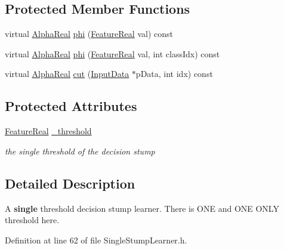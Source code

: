 \subsection*{Protected Member Functions}
\begin{DoxyCompactItemize}
\item 
virtual \hyperlink{Defaults_8h_a80184c4fd10ab70a1a17c5f97dcd1563}{AlphaReal} \hyperlink{classMultiBoost_1_1SingleStumpLearner_a7081db9aa7b8abcb6d7021d91fac5455}{phi} (\hyperlink{Defaults_8h_a3a11cfe6a5d469d921716ca6291e934f}{FeatureReal} val) const 
\item 
virtual \hyperlink{Defaults_8h_a80184c4fd10ab70a1a17c5f97dcd1563}{AlphaReal} \hyperlink{classMultiBoost_1_1SingleStumpLearner_a1aed018039f3f3ae08f2088ac2d080ba}{phi} (\hyperlink{Defaults_8h_a3a11cfe6a5d469d921716ca6291e934f}{FeatureReal} val, int classIdx) const 
\item 
virtual \hyperlink{Defaults_8h_a80184c4fd10ab70a1a17c5f97dcd1563}{AlphaReal} \hyperlink{classMultiBoost_1_1SingleStumpLearner_a95c26833c3258967ddb4f5e4d20cdea9}{cut} (\hyperlink{classMultiBoost_1_1InputData}{InputData} $\ast$pData, int idx) const 
\end{DoxyCompactItemize}
\subsection*{Protected Attributes}
\begin{DoxyCompactItemize}
\item 
\hypertarget{classMultiBoost_1_1SingleStumpLearner_a0c3336e14bc4026d185e3f6c1c431755}{
\hyperlink{Defaults_8h_a3a11cfe6a5d469d921716ca6291e934f}{FeatureReal} \hyperlink{classMultiBoost_1_1SingleStumpLearner_a0c3336e14bc4026d185e3f6c1c431755}{\_\-threshold}}
\label{classMultiBoost_1_1SingleStumpLearner_a0c3336e14bc4026d185e3f6c1c431755}

\begin{DoxyCompactList}\small\item\em the single threshold of the decision stump \end{DoxyCompactList}\end{DoxyCompactItemize}


\subsection{Detailed Description}
A {\bfseries single} threshold decision stump learner. There is ONE and ONE ONLY threshold here. 

Definition at line 62 of file SingleStumpLearner.h.



